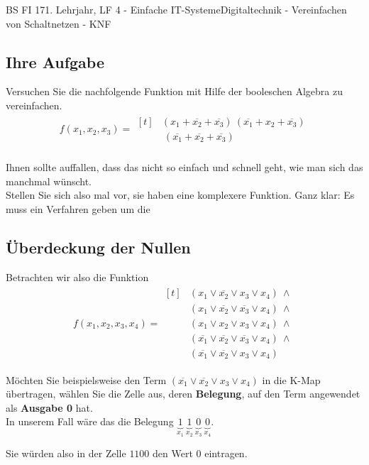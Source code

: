 \documentclass[11pt,twocolumn,oneside,openany,headings=optiontotoc,11pt,numbers=noenddot]{article}
\begin{document}
\begin{worksheet}{BS FI 17}{1. Lehrjahr, LF 4 - Einfache IT-Systeme}{Digitaltechnik - Vereinfachen von Schaltnetzen - KNF}
		\subsection*{Ihre Aufgabe} Versuchen Sie die nachfolgende Funktion mit Hilfe der booleschen Algebra zu vereinfachen.
		\begin{align*}
			f(x_1,x_2,x_3) = 
			\!\begin{aligned}[t]
				& (x_1+ \overline{x_2} + \overline{x_3}) \  (\overline{x_1} + x_2 + \overline{x_3}) \\
				& \  (\overline{x_1} + \overline{x_2} + \overline{x_3})
			\end{aligned}
		\end{align*}\\
		Ihnen sollte auffallen, dass das nicht so einfach und schnell geht, wie man sich das manchmal wünscht.\\
		Stellen Sie sich also mal vor, sie haben eine komplexere Funktion. Ganz klar: Es muss ein Verfahren geben um die 
		
		\subsection{Überdeckung der Nullen} Betrachten wir also die Funktion\\
		\begin{align*}
			f(x_1,x_2,x_3,x_4) = \!\begin{aligned}[t]
				& (x_1\lor \overline{x_2}\lor x_3\lor x_4)\ \land\\
				& (x_1\lor \overline{x_2}\lor \overline{x_3}\lor x_4)\ \land\\
				& (x_1\lor x_2\lor x_3\lor x_4 )\ \land\\
				& (\overline{x_1}\lor \overline{x_2}\lor \overline{x_3}\lor x_4)\ \land\\
				& (\overline{x_1}\lor \overline{x_2}\lor x_3\lor x_4)
			\end{aligned}
		\end{align*}
		\begin{framed}
			\noindent
			Möchten Sie beispielsweise den Term \((\overline{x_1}\lor \overline{x_2}\lor x_3\lor x_4)\) in die K-Map übertragen, wählen Sie die Zelle aus, deren \textbf{Belegung}, auf den Term angewendet als \textbf{Ausgabe 0} hat.\\
			In unserem Fall wäre das die Belegung \(\underbrace{1}_{x_1}\ \underbrace{1}_{x_2}\ \underbrace{0}_{x_3}\ \underbrace{0}_{x_4}\).\\
			\par\noindent
			Sie würden also in der Zelle \(1100\) den Wert \(0\) eintragen.
		\end{framed}

\end{worksheet}
\end{document}
